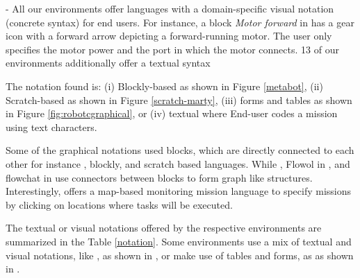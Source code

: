 \parhead{\fnotation} - All our environments offer languages with a domain-specific visual notation (concrete syntax) for end users. For instance, a block \emph{Motor forward} in \trik has a gear icon with a forward arrow depicting a forward-running motor. The user only specifies the motor power and the port in which the motor connects. 13 of our environments additionally offer a textual syntax

The notation found is: (i) Blockly-based as shown in Figure \ref{metabot}, (ii) Scratch-based as shown in Figure
	\ref{scratch-marty}, (iii) forms and tables as shown in Figure \ref{fig:robotcgraphical}, or (iv) textual where End-user codes a mission using text characters.


Some of the graphical notations used blocks, which are directly connected to each other for instance \trik, blockly, and scratch based languages. While \choregraphe, Flowol in \robotmesh, and flowchat in \picaxe use connectors between blocks to form graph like structures. %
Interestingly, \flyaq offers a map-based 
monitoring mission language to specify missions by clicking on locations where tasks will be executed. 

The textual or visual notations offered by the respective environments are summarized in the Table \ref{notation}. Some environments use a mix of textual and visual notations, like \easyc, as shown in , or make use of tables and forms, as \robotc as shown in  %
.

